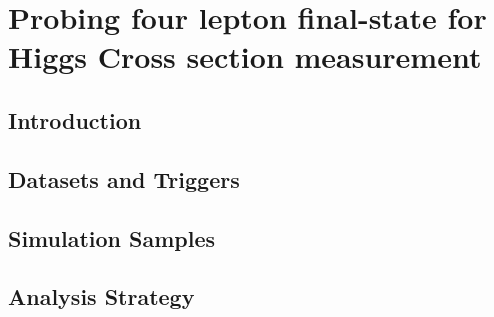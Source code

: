 \documentclass[
12pt, %
english, %
singlespacing, %
liststotoc, %
headsepline, %
]{MastersDoctoralThesis} %
\begin{document}
\label{thesis_introduction} %
\chapter{Probing four lepton final-state for Higgs Cross section measurement}\label{Chapter4}
  \section{Introduction}\label{sec:Introduction}
    \section{Datasets and Triggers}\label{sec:Datasets}
    \section{Simulation Samples} \label{sec:Simulations}
  \section{Analysis Strategy}\label{sec:AnalysisStrategy} %
    \label{sec:GeneralStrategy} %
\end{document}
